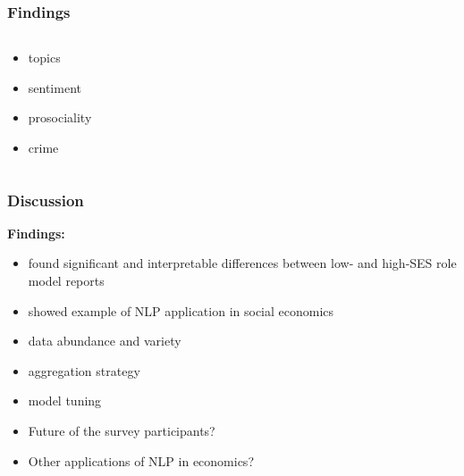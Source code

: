 \begin{frame}
	\frametitle{Findings}
	\begin{columns}[t]
		\begin{column}{0.18\textwidth}
			\begin{itemize}
				\item<1> topics
				\item<2> sentiment
				\item<3> prosociality
				\item<4> crime
			\end{itemize}
		\end{column}
		\begin{column}{0.82\textwidth}
			\only<1>{
				\begin{figure}
					\resizebox{7cm}{!}{}
				\end{figure}
			}
			\only<2>{
				\begin{figure}
					\resizebox{7cm}{!}{}
				\end{figure}
			}
			\only<3>{
				\begin{figure}
					\resizebox{7cm}{!}{}
				\end{figure}
			}
			\only<4>{
				\begin{figure}
					\resizebox{7cm}{!}{}
				\end{figure}
			}
		\end{column}
	\end{columns}
\end{frame}

\begin{frame}
	\frametitle{Discussion}
	\textbf{Findings:}
	\begin{itemize}
		\item<1->[\checkmark] found significant and interpretable differences between low- and high-SES role model reports
		\item<2->[\checkmark] showed example of NLP application in social economics
	\end{itemize}

	\begin{itemize}
		\item<3->[!] data abundance and variety
		\item<4->[!] aggregation strategy
		\item<5->[!] model tuning
	\end{itemize}

	\begin{itemize}
		\item <6->{Future of the survey participants?}
		\item <6->{Other applications of NLP in economics?}
	\end{itemize}
\end{frame}
